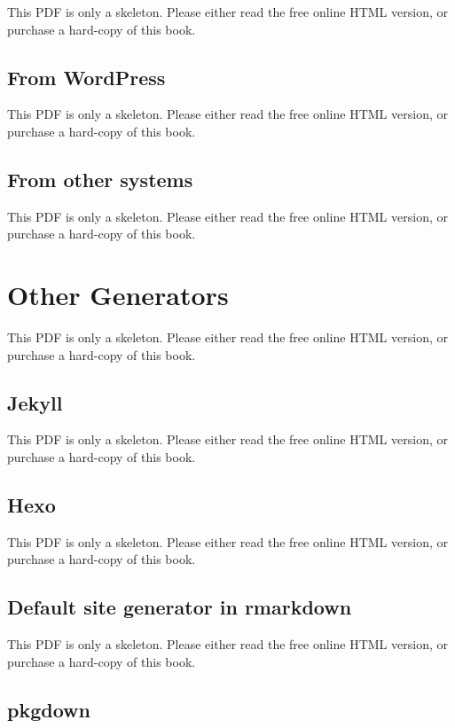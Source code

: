 \documentclass[
  12pt,
]{krantz}
\begin{document}
This PDF is only a skeleton. Please either read the free online HTML version, or purchase a hard-copy of this book.

\section{From WordPress}\label{from-wordpress}

This PDF is only a skeleton. Please either read the free online HTML version, or purchase a hard-copy of this book.

\section{From other systems}\label{from-other-systems}

This PDF is only a skeleton. Please either read the free online HTML version, or purchase a hard-copy of this book.

\chapter{Other Generators}\label{other-generators}

This PDF is only a skeleton. Please either read the free online HTML version, or purchase a hard-copy of this book.

\section{Jekyll}\label{jekyll}

This PDF is only a skeleton. Please either read the free online HTML version, or purchase a hard-copy of this book.

\section{Hexo}\label{hexo}

This PDF is only a skeleton. Please either read the free online HTML version, or purchase a hard-copy of this book.

\section{Default site generator in rmarkdown}\label{rmd-website}

This PDF is only a skeleton. Please either read the free online HTML version, or purchase a hard-copy of this book.

\section{pkgdown}\label{pkgdown}
\end{document}
